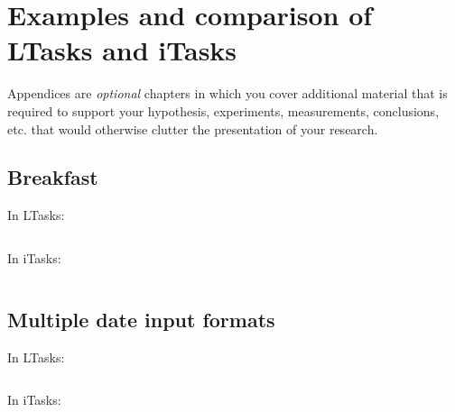 \chapter{Examples and comparison of LTasks and iTasks}\label{appendix}
Appendices are \emph{optional} chapters in which you cover additional material that is required to support your
hypothesis, experiments, measurements, conclusions, etc. that would otherwise
clutter the presentation of your research.

\section{Breakfast}\label{appendix-breakfast}
In LTasks:

\medskip
\inputminted{lua}{examples/breakfast.lua}

\medskip
In iTasks: 

\inputminted{clean}{examples/breakfast.icl}

\section{Multiple date input formats}\label{appendix-dates}
In LTasks:

\medskip
\inputminted{lua}{examples/date.lua}

\medskip
In iTasks: 

